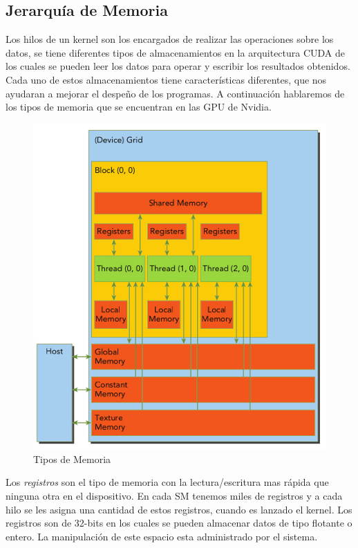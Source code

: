\subsection{Jerarquía de Memoria}


Los hilos de un kernel son los encargados de realizar las operaciones sobre los datos, se tiene diferentes tipos de almacenamientos en la arquitectura CUDA de los cuales se pueden leer los datos para operar y escribir los resultados obtenidos. Cada uno de estos almacenamientos tiene características diferentes, que nos ayudaran a mejorar el despeño de los programas. A continuación hablaremos de los tipos de memoria que se encuentran en las GPU de Nvidia.

\begin{figure}[h]
			\centering
				\includegraphics[scale=0.6]{img/memoria.jpg}
			\caption{Tipos de Memoria }
\end{figure}

Los \textit{registros} son el tipo de memoria con la lectura/escritura mas rápida que ninguna otra en el dispositivo. En cada SM tenemos miles de registros y a cada hilo se les asigna una cantidad de estos registros, cuando es lanzado el kernel. Los registros son de 32-bits en los cuales se pueden almacenar datos de tipo flotante o entero. La manipulación de este espacio esta administrado por el sistema.

